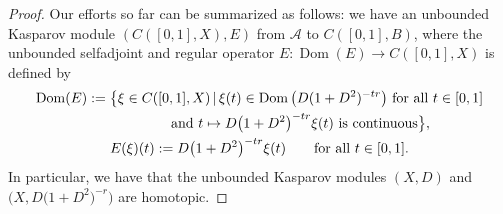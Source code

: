 \documentclass[11pt]{article}
\numberwithin{equation}{section}
\newcommand{\s}[1]{\mathscr{#1}}
\newcommand{\q}{\qquad}
\begin{document}
\begin{proof}
Our efforts so far can be summarized as follows: we have an unbounded Kasparov module $( C([0,1],X), E)$ from $\s A$ to $C([0,1],B)$, where the unbounded selfadjoint and regular operator $E\colon \operatorname{Dom}(E) \to C( [0,1],X)$ is defined by
\begin{gather*}
\operatorname{Dom}(E) := \big\{ \xi \in C( [0,1],X) \,|\, \xi(t) \in \operatorname{Dom}\big( D(1 + D^2)^{-tr}\big) \ \text{for all} \ t \in [0,1] \\
\hphantom{\operatorname{Dom}(E) :=\big\{}{} \text{and} \ t \mapsto D\big(1 + D^2\big)^{-tr} \xi(t) \ \text{is continuous} \big\}, \\
E(\xi)(t) := D\big(1 + D^2\big)^{-tr} \xi(t) \q \text{for all } t \in [0,1] .
\end{gather*}
In particular, we have that the unbounded Kasparov modules $(X,D)$ and $\big(X, D\big(1 + D^2\big)^{-r}\big)$ are homotopic.


\end{proof}
\end{document}
